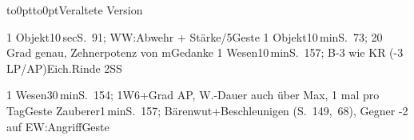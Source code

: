 \documentclass{m5figur-mv}[2016/01/04]
\begin{document}
{{{
}%

\vbox to0pt{\vspace*{17cm}\hbox to0pt{\hspace*{2cm}Veraltete Version}}


%
  {1 Objekt}{10\,sec}{S.~91; WW:Abwehr + Stärke/5}{Geste}
%
  {1 Objekt}{10\,min}{S.~73; 20 Grad genau, Zehnerpotenz von m}{Gedanke}
%
  {1 Wesen}{10\,min}{S.~157; B-3 wie KR (-3 LP/AP)}{Eich.Rinde 2SS}

%
  {1 Wesen}{30\,min}{S.~154; 1W6+Grad AP, W.-Dauer auch über Max,
  1 mal pro Tag}{Geste}
%
  {Zauberer}{1\,min}{S.~157; Bärenwut+Beschleunigen (S.~149,~68),
  Gegner -2 auf EW:Angriff}{Geste}





}}
\end{document}
